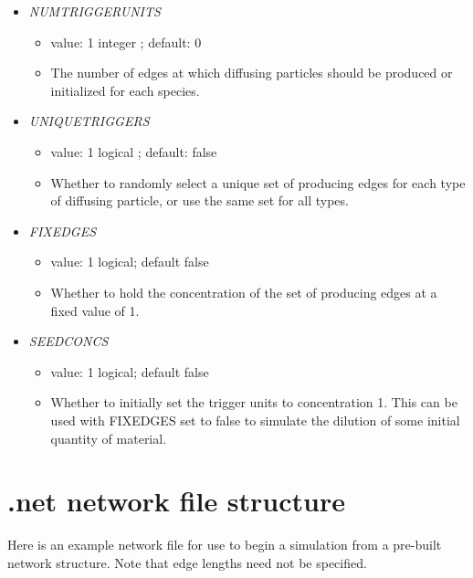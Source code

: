 \documentclass[12pt]{article}
\begin{document}
\begin{itemize}
  \begin{itemize}
    \item  value: 1 or NSPECIES floats; default $-1.0$
    \item Rate at which diffusing particles of each type decay on the network.
  \end{itemize}
%
\item {\it NUMTRIGGERUNITS}
  \begin{itemize}
    \item  value: 1 integer ; default: $0$
    \item The number of edges at which diffusing particles should be produced or initialized for each species.
  \end{itemize}
%
\item {\it UNIQUETRIGGERS}
  \begin{itemize}
    \item  value: 1 logical ; default: false
    \item Whether to randomly select a unique set of producing edges for each type of diffusing particle, or use the same set for all types.
  \end{itemize}
%
\item {\it FIXEDGES}
  \begin{itemize}
    \item  value: 1 logical; default false
    \item Whether to hold the concentration of the set of producing edges at a fixed value of 1.
  \end{itemize}
%
\item {\it SEEDCONCS}
  \begin{itemize}
    \item  value: 1 logical; default false
    \item Whether to initially set the trigger units to concentration 1. This can be used with FIXEDGES set to false to simulate the dilution of some initial quantity of material.
  \end{itemize}

\end{itemize}


\section{.net network file structure}
\label{sec:netfile}
Here is an example network file for use to begin a simulation from a pre-built network structure. Note that edge lengths need not be specified.
\end{document}
